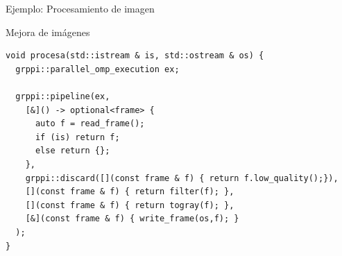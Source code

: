 \begin{frame}[t,fragile]{Ejemplo: Procesamiento de imagen}
\begin{block}{Mejora de imágenes}
\begin{lstlisting}
void procesa(std::istream & is, std::ostream & os) {
  grppi::parallel_omp_execution ex;

  grppi::pipeline(ex,
    [&]() -> optional<frame> {
      auto f = read_frame();
      if (is) return f;
      else return {};
    },
    grppi::discard([](const frame & f) { return f.low_quality();}),
    [](const frame & f) { return filter(f); },
    [](const frame & f) { return togray(f); },
    [&](const frame & f) { write_frame(os,f); }
  );
}
\end{lstlisting}
\end{block}
\end{frame}

